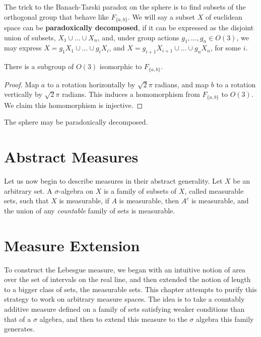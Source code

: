 The trick to the Banach-Tarski paradox on the sphere is to find subsets of the orthogonal group that behave like $F_{\{a,b\}}$. We will say a subset $X$ of euclidean space can be {\bf paradoxically decomposed}, if it can be expressed as the disjoint union of subsets, $X_1 \cup \dots \cup X_n$, and, under group actions $g_1, \dots, g_n \in O(3)$, we may express $X = g_1X_1 \cup \dots \cup g_iX_i$, and $X = g_{i+1}X_{i+1} \cup \dots \cup g_nX_n$, for some $i$.

\begin{lemma}
    There is a subgroup of $O(3)$ isomorphic to $F_{\{a,b\}}$.
\end{lemma}
\begin{proof}
    Map $a$ to a rotation horizontally by $\sqrt{2}\pi$ radians, and map $b$ to a rotation vertically by $\sqrt{2}\pi$ radians. This induces a homomorphism from $F_{\{a,b\}}$ to $O(3)$. We claim this homomorphism is injective.
\end{proof}

\begin{theorem}
    The sphere may be paradoxically decomposed.
\end{theorem}




\chapter{Abstract Measures}

Let us now begin to describe measures in their abstract generality. Let $X$ be an arbitrary set. A $\sigma$-algebra on $X$ is a family of subsets of $X$, called measurable sets, such that $X$ is measurable, if $A$ is measurable, then $A^c$ is measurable, and the union of any {\it countable} family of sets is measurable.

\chapter{Measure Extension}

To construct the Lebesgue measure, we began with an intuitive notion of area over the set of intervals on the real line, and then extended the notion of length to a bigger class of sets, the measurable sets. This chapter attempts to purify this strategy to work on arbitrary measure spaces. The idea is to take a countably additive measure defined on a family of sets satisfying weaker conditions than that of a $\sigma$ algebra, and then to extend this measure to the $\sigma$ algebra this family generates.

